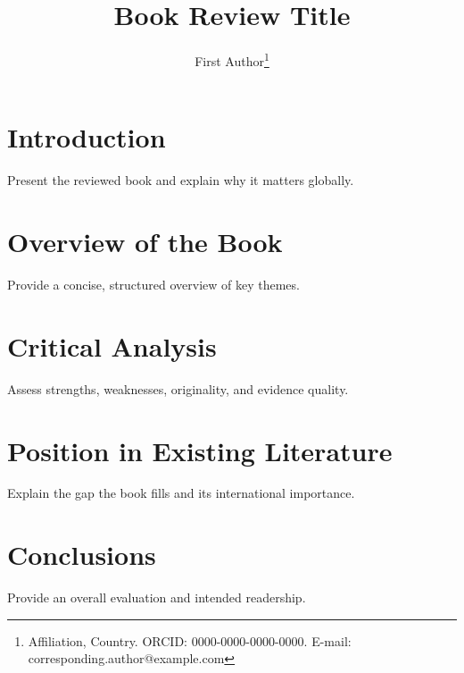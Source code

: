\documentclass[12pt,a4paper]{article}
\title{Book Review Title}
\author{First Author\footnote{Affiliation, Country. ORCID: 0000-0000-0000-0000. E-mail: corresponding.author@example.com}}
\date{}
\begin{document}
\maketitle

\begin{sdqabstract}
\end{sdqabstract}


\section{Introduction}
Present the reviewed book and explain why it matters globally.

\section{Overview of the Book}
Provide a concise, structured overview of key themes.

\section{Critical Analysis}
Assess strengths, weaknesses, originality, and evidence quality.

\section{Position in Existing Literature}
Explain the gap the book fills and its international importance.

\section{Conclusions}
Provide an overall evaluation and intended readership.

\printbibliography[title={References}]
\end{document}
